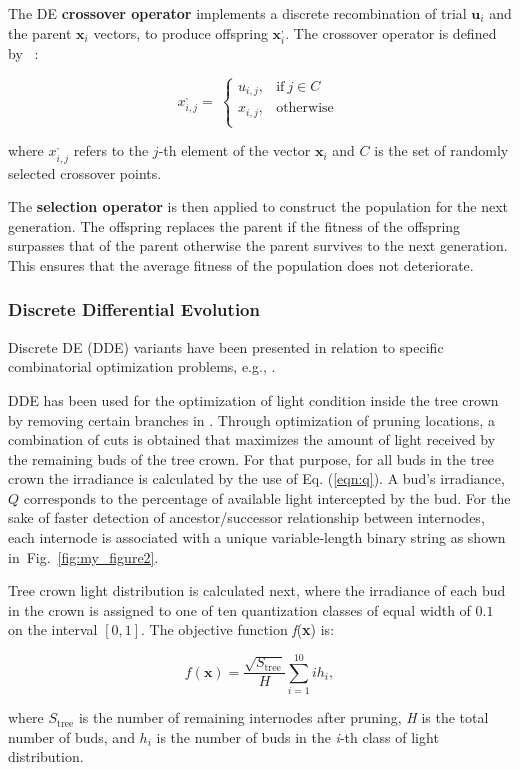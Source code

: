 The DE  \textbf{crossover operator} implements a discrete recombination of trial $\mathbf{u}_i$ and the parent $\mathbf{x}_i$ vectors, to produce offspring $\mathbf{x}^{,}_i$. The crossover operator is defined by ~\cite{engelbrecht2008computational}:
\begin{linenomath}
\begin{equation}
     x^{,}_{i,j} = \ \left\{ \begin{matrix}
u_{i,j}, & \mathrm{\text{if}}\ j \in C \\
x_{i,j}, & \mathrm{\text{otherwise}} \\
\end{matrix} \right.\   
\end{equation}
\end{linenomath}
where $x^{,}_{i,j}$ refers to the $j$-th element of the vector $\mathbf{x}_i$ and $C$ is the set of randomly selected crossover points.

The \textbf{selection operator} is then applied to construct the population for the next generation. The offspring replaces the parent if the fitness of the offspring surpasses that of the parent otherwise the parent survives to the next generation. This ensures that the average fitness of the population does not deteriorate.

\subsubsection{Discrete Differential Evolution}
Discrete DE (DDE) variants have been presented in relation to specific
combinatorial optimization problems, e.g., \cite{davendra_flow_2009,pan_discrete_2008,wang_novel_2010}. 

DDE has
been used for the optimization of light condition inside the tree crown
by removing certain branches in \cite{strnad_novel_2017}.
Through optimization of pruning locations, a combination of cuts is obtained
that maximizes the amount of light received by the remaining buds of the
tree crown. For that purpose, for all buds in the tree crown the
irradiance is calculated by the use of Eq. (\ref{eqn:q}). A bud's irradiance, \(Q\)
corresponds to the percentage of available light intercepted by the bud.
For the sake of faster detection of ancestor/successor relationship
between internodes, each internode is associated with a unique
variable-length binary string as shown in~Fig.~\ref{fig:my_figure2}. 

Tree crown light
distribution is calculated next, where the irradiance of each bud in the crown is assigned to one of ten quantization classes of equal width of $0.1$ on
the interval $[0, 1]$. The objective function 
\emph{f}(\textbf{x}) is:
\begin{linenomath}
\begin{equation}
 f\left( \mathbf{x} \right) = \frac{\sqrt{S_{\mathrm{\text{tree}}}}}{H}\sum_{i = 1}^{10}{i  h_{i}}, 
\end{equation}
\end{linenomath}
where \(S_{\mathrm{\text{tree}}}\) is the number of remaining internodes
after pruning, \emph{H} is the total number of buds, and \(h_{i}\) is
the number of buds in the \emph{i}-th class of light distribution.

